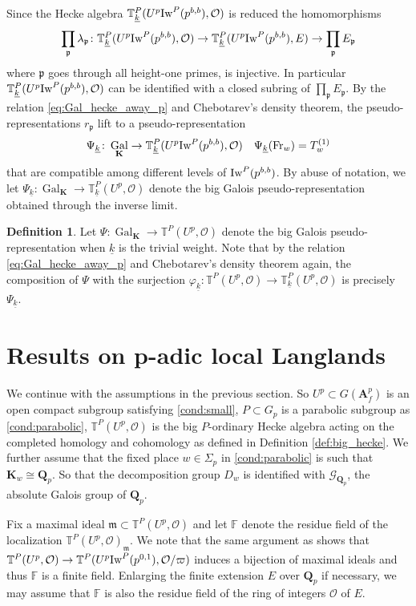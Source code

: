 \documentclass[leqno]{amsart}
\newcommand{\fF}{\mathbb{F}} %
\newcommand{\wt}[1]{\underline{ #1 }}
\newcommand{\TT}{\mathbb{T}} %
\newcommand{\Iw}{\textnormal{Iw}}
\newcommand{\Gp}{\mathcal{G}_{\Qp}} %
\newcommand{\Fr}{\textnormal{Fr}} %
\DeclareMathOperator{\Gal}{Gal}
\newcommand{\Qp}{\mathbf{Q}_p}
\newcommand{\A}{\mathbf A}
\newcommand{\K}{{\mathbf{K}}} %
\newcommand{\oo}{\mathcal{O}} %
\newcommand{\fm}{\mathfrak{m}}
\newcommand{\fp}{\mathfrak{p}}
\theoremstyle{definition}
\newtheorem{defn}[thm]{Definition}
\theoremstyle{remark}
\begin{document}
Since the Hecke algebra 
$\TT^P_{\wt{k}}(U^p\Iw^P(p^{b,b}),\oo)$
is reduced the homomorphisms
\[
	\prod_{\fp}\lambda_{\fp}\colon 
	\TT^P_{\wt{k}}(U^p\Iw^P(p^{b,b}),\oo)\to 
	\TT^P_{\wt{k}}(U^p\Iw^P(p^{b,b}),E)\to  
	\prod_{\fp}E_{\fp}
\]
where $\fp$ goes through all height-one primes,
is injective.
In particular $\TT^P_{\wt{k}}(U^p\Iw^P(p^{b,b}),\oo)$
can be identified with 
a closed subring of $\prod_{\fp}E_{\fp}$.
By the relation \eqref{eq:Gal_hecke_away_p}
and Chebotarev's density theorem,
the pseudo-representations  $r_{\fp}$
lift to a pseudo-representation
\begin{equation}\label{eq:pseudo_rep_finite}
	\Psi_{\wt{k}}\colon \Gal_{\K}
	\to \TT^P_{\wt{k}}(U^p\Iw^P(p^{b,b}),\oo)\quad
	\Psi_{\wt{k}}(\Fr_w)=T_w^{(1)}
\end{equation}
that are compatible among different levels of $\Iw^P(p^{b,b})$.
By abuse of notation,
we let 
$\Psi_{\wt{k}}\colon \Gal_{\K} \to \TT^P_{\wt{k}}(U^p,\oo)$
denote the big Galois pseudo-representation 
obtained through the inverse limit.

\begin{defn}\label{def:big_Gal}
Let $\Psi\colon \Gal_{\K}\to \TT^P(U^p,\oo)$	
denote the big Galois pseudo-representation
when $\wt{k}$ is the trivial weight.
Note that by the relation \eqref{eq:Gal_hecke_away_p}
and Chebotarev's density theorem again,
the composition of $\Psi$
with the surjection
$\varphi_{\wt{k}}\colon 
\TT^P(U^p,\oo)\to \TT^P_{\wt{k}}(U^p,\oo)$
is precisely  $\Psi_{\wt{k}}$.
\end{defn}


\section{Results on p-adic local Langlands}

We continue with the assumptions
in the previous section.
So $U^p\subset G(\A_f^p)$ is an
open compact subgroup satisfying \eqref{cond:small},
$P\subset G_p$ is a parabolic subgroup
as \eqref{cond:parabolic},
$\TT^P(U^p,\oo)$
is the big  $P$-ordinary Hecke algebra
acting on the completed homology 
and cohomology as defined in Definition \ref{def:big_hecke}.
We further assume that 
the fixed place $w\in \Sigma_p$
in \eqref{cond:parabolic}
is such that  $\K_w\cong \Qp$.
So that the decomposition group
$D_w$ is identified with
$\Gp$, the absolute Galois group of  $\Qp$.



Fix a maximal ideal $\fm\subset \TT^P(U^p,\oo)$
and let $\fF$ denote the residue field of the localization
$\TT^P(U^p,\oo)_{\fm}$.
We note that the same argument
as \cite[Prop 3.3.6]{pan} shows that
$\TT^P(U^p,\oo)\to \TT^P(U^p\Iw^P(p^{0,1}),\oo/\varpi)$ 
induces a bijection of maximal ideals
and thus $\fF$ is a finite field.
Enlarging the finite extension  $E$ over  $\Qp$
if necessary,
we may assume that  $\fF$ is also 
the residue field of the ring of integers  $\oo$ of  $E$.
\end{document}
